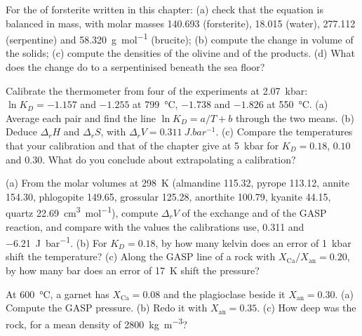 \begin{exercise}[$\star$]\label{exo:b2:pt-paths:4}
For the  of forsterite written in this chapter: (a) check that the
equation is balanced in mass, with molar masses 140.693 (forsterite), 18.015 (water),
277.112 (serpentine) and \qty{58.320}{g.mol^{-1}} (brucite); (b) compute the change in
volume of the solids; (c) compute the densities of the olivine and of the products.
(d) What does the change do to a serpentinised  beneath the sea floor?
\end{exercise}

\begin{exercise}[$\star\star$]\label{exo:b2:pt-paths:5}
Calibrate the thermometer from four of the experiments at \qty{2.07}{kbar}: $\ln K_D =
-1.157$ and $-1.255$ at \qty{799}{\celsius}, $-1.738$ and $-1.826$ at \qty{550}{\celsius}.
(a) Average each pair and find the line $\ln K_D = a/T + b$ through the two means.
(b) Deduce $\Delta_r H$ and $\Delta_r S$, with $\Delta_r V = \qty{0.311}{J.bar^{-1}}$.
(c) Compare the temperatures that your calibration and that of the chapter give at
\qty{5}{kbar} for $K_D = 0.18$, $0.10$ and $0.30$. What do you conclude about
extrapolating a calibration?
\end{exercise}

\begin{exercise}[$\star\star$]\label{exo:b2:pt-paths:6}
(a) From the molar volumes at \qty{298}{K} (almandine 115.32, pyrope 113.12, annite
154.30, phlogopite 149.65, grossular 125.28, anorthite 100.79, kyanite 44.15, quartz
\qty{22.69}{cm^3.mol^{-1}}), compute $\Delta_r V$ of the exchange and of the GASP
reaction, and compare with the values the calibrations use, \num{0.311} and
\qty{-6.21}{J.bar^{-1}}. (b) For $K_D = 0.18$, by how many kelvin does an error of
\qty{1}{kbar} shift the temperature? (c) Along the GASP line of a rock with
$X_{\text{Ca}}/X_{\text{an}} = 0.20$, by how many bar does an error of \qty{17}{K} shift
the pressure?
\end{exercise}

\begin{exercise}[$\star\star$]\label{exo:b2:pt-paths:7}
At \qty{600}{\celsius}, a garnet has $X_{\text{Ca}} = 0.08$ and the plagioclase beside it
$X_{\text{an}} = 0.30$. (a) Compute the GASP pressure. (b) Redo it with $X_{\text{an}} =
0.35$. (c) How deep was the rock, for a mean density of \qty{2800}{kg.m^{-3}}?
\end{exercise}

